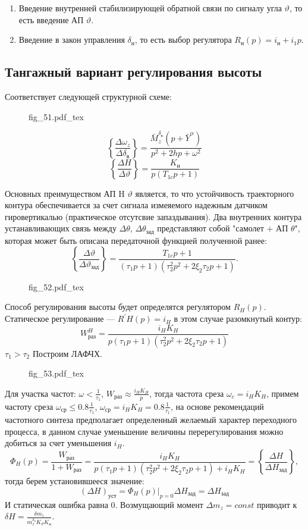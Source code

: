 \documentclass{article}
\newcommand{\incfig}[1]{
    {#1.pdf_tex}
}
\begin{document}
\begin{enumerate}
\item Введение внутренней стабилизирующей обратной связи по сигналу угла $\vartheta$, то есть введение АП $\vartheta$.
\item Введение в закон управления $\delta_н$, то есть выбор регулятора $R_н(p) = i_н + i_1p$.
\end{enumerate}

\subsection{Тангажный вариант регулирования высоты}
Соответствует следующей структурной схеме:

\begin{figure}[H]
    \centering
    \incfig{fig_51}
    \label{fig:fig_51}
\end{figure}

\[
    \left\{\frac{\Delta \omega_z}{\Delta \delta_в} \right\} = \frac{\bar{M}_z^{\delta_в}(p + \bar{Y}^\alpha)}{p^2 + 2hp + \omega^2} 
\]
\[
    \left\{ \frac{\Delta H}{\Delta \vartheta} \right\} = \frac{K_н}{p(T_{1c}p +1)}
\]

Основных преимуществом АП H $\vartheta$ является, то что устойчивость траекторного контура обеспечивается за счет сигнала измеяемого надежным датчиком гировертикалью (практическое отсутсвие запаздывания). Два внутренних контура устанавливающих связь между $\Delta \theta$, $\Delta \theta_{зад}$ представляют собой "самолет + АП $\theta$", которая может быть описана передаточной функцией полученной ранее:
\[
\left\{\frac{\Delta \vartheta}{\Delta \vartheta_{зад}} \right\} =\frac{T_{1c}p + 1}{(\tau_1 p + 1) (\tau_2^2p^2 + 2 \xi_2 \tau_2 p + 1)}.
\]
\begin{figure}[H]
    \centering
    \incfig{fig_52}
    \label{fig:fig_52}
\end{figure}
Способ регулирования высоты будет определятся регулятором $R_H(p)$.
Статическое регулирование --- $R^{'}H(p) = i_H$ в этом случае разомкнутый контур:
\[
W_{раз}^H =\frac{i_H K_H}{p(\tau_1 p + 1)(\tau_2^2 p^2 + 2 \xi_2 \tau_2 p + 1)} 
\]
$\tau_1 > \tau_2$
Построим ЛАФЧХ. 

\begin{figure}[H]
    \centering
    \incfig{fig_53}
    \label{fig:fig_53}
\end{figure}


Для участка частот:
$\omega < \frac{1}{\tau_1}$, $W_{раз} \approx \frac{i_H K_H }{p} $, тогда частота среза $\omega_c = i_H  K_H$, примем частоту среза $\omega_{ср} \le  0.8 \frac{1}{\tau_1}$, $\omega_{ср} = i_H K_H =0.8 \frac{1}{\tau_1} $, на основе рекомендаций частотного синтеза предполагает определенный желаемый характер переходного процесса, в данном случае уменьшение величины перерегулирования можно добиться за счет уменьшения $i_H$. 
\[
    \Phi_H (p) =\frac{W_{раз}}{1 + W_{раз}} =\frac{i_H K_H}{p(\tau_1 p +1)(\tau_2^2 p^2 + 2 \xi_2 \tau_2 p + 1) + i_H K_H} = \left\{ \frac{\Delta H}{\Delta H_{зад}} \right\},
\]
тогда берем установившееся значение:
\[
(\Delta H)_{уст} = \Phi_H(p)|_{p=0} \Delta H_{зад} = \Delta H_{зад}
\]
И статическая ошибка равна 0. Возмущающий момент $\Delta m_z = const$ приводит к $\delta H =\frac{\delta m_z}{m_z^{\delta_н} K_\vartheta K_н}$.
\end{document}
